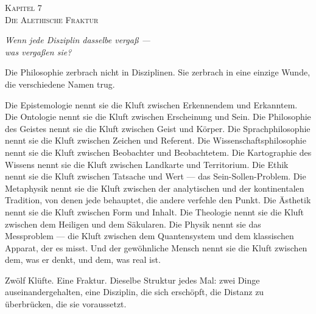 \documentclass[10pt, openany, oneside]{book}
\renewcommand{\large}{\fontsize{11.5}{14}\selectfont}
\renewcommand{\huge}{\fontsize{17}{21}\selectfont}
\begin{document}
\newpage

\begin{center}
    {\huge\scshape Kapitel 7}\\[0.3em]
    {\large\scshape Die Alethische Fraktur}
\end{center}

\vspace{1.5em}

\begin{center}
    \itshape
    Wenn jede Disziplin dasselbe vergaß ---\\
    was vergaßen sie?
\end{center}

\vspace{2em}


\noindent Die Philosophie zerbrach nicht in Disziplinen. Sie zerbrach in eine einzige Wunde, die verschiedene Namen trug.

Die Epistemologie nennt sie die Kluft zwischen Erkennendem und Erkanntem. Die Ontologie nennt sie die Kluft zwischen Erscheinung und Sein. Die Philosophie des Geistes nennt sie die Kluft zwischen Geist und Körper. Die Sprachphilosophie nennt sie die Kluft zwischen Zeichen und Referent. Die Wissenschaftsphilosophie nennt sie die Kluft zwischen Beobachter und Beobachtetem. Die Kartographie des Wissens nennt sie die Kluft zwischen Landkarte und Territorium. Die Ethik nennt sie die Kluft zwischen Tatsache und Wert --- das Sein-Sollen-Problem. Die Metaphysik nennt sie die Kluft zwischen der analytischen und der kontinentalen Tradition, von denen jede behauptet, die andere verfehle den Punkt. Die Ästhetik nennt sie die Kluft zwischen Form und Inhalt. Die Theologie nennt sie die Kluft zwischen dem Heiligen und dem Säkularen. Die Physik nennt sie das Messproblem --- die Kluft zwischen dem Quantensystem und dem klassischen Apparat, der es misst. Und der gewöhnliche Mensch nennt sie die Kluft zwischen dem, was er denkt, und dem, was real ist.

Zwölf Klüfte. Eine Fraktur. Dieselbe Struktur jedes Mal: zwei Dinge auseinandergehalten, eine Disziplin, die sich erschöpft, die Distanz zu überbrücken, die sie voraussetzt.

\vspace{1.5em}

\end{document}
